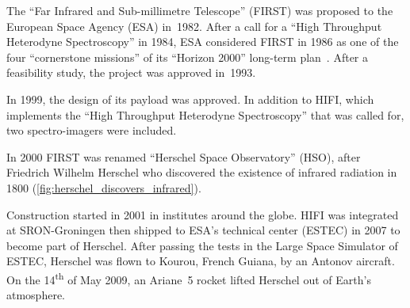 The ``Far Infrared and Sub-millimetre Telescope'' (FIRST) was proposed to the European Space Agency (ESA) in~1982.
After a call for a ``High Throughput Heterodyne Spectroscopy'' in 1984,
ESA considered FIRST in 1986 as one of the four ``cornerstone missions'' of its ``Horizon 2000'' long-term plan~\parencite{pilbratt1997first}.
After a feasibility study, the project was approved in~1993.

In 1999, the design of its payload was approved.
In addition to HIFI, which implements the ``High Throughput Heterodyne Spectroscopy'' that was called for, two spectro-imagers were included.

In 2000 FIRST was renamed ``Herschel Space Observatory'' (HSO), after Friedrich Wilhelm Herschel who discovered the existence of infrared radiation in 1800 (\cref{fig:herschel_discovers_infrared}).

Construction started in 2001 in institutes around the globe.
HIFI was integrated at SRON-Groningen then shipped to ESA's technical center (ESTEC) in 2007 to become part of Herschel.
After passing the tests in the Large Space Simulator of ESTEC, Herschel was flown to Kourou, French Guiana, by an Antonov aircraft.
On the 14\textsuperscript{th} of May 2009, an Ariane~5 rocket lifted Herschel out of Earth's atmosphere.

